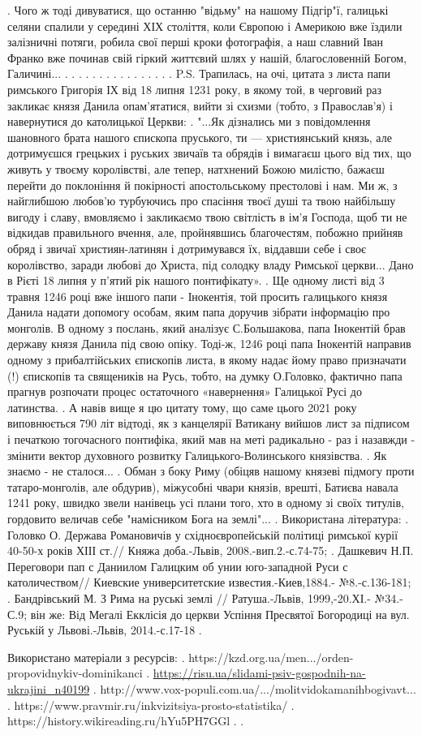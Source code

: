 .
Чого ж тоді дивуватися, що останню "відьму" на нашому Підгір"ї, галицькі селяни спалили у середині ХІХ століття, коли Європою і Америкою вже їздили залізничні потяги, робила свої перші кроки фотографія, а наш славний  Іван Франко вже  починав свій гіркий життєвий шлях у нашій, благословенній Богом, Галичині...
.
.
.
.
.
.
.
.
.
.
.
.
.
.
.
.
P.S.
Трапилась, на очі, цитата з листа папи римського Григорія ІХ від 18 липня 1231 року, в якому той, в черговий раз закликає князя Данила опам'ятатися, вийти зі схизми (тобто, з Православ'я) і навернутися до католицької Церкви:
.
"...Як дізнались ми з повідомлення шановного брата нашого єпископа пруського, ти — християнський князь, але дотримуєшся грецьких і руських звичаїв та обрядів і вимагаєш цього від тих, що живуть у твоєму королівстві, але тепер, натхнений Божою милістю, бажаєш перейти до поклоніння й покірності апостольському престолові і нам. Ми ж, з найглибшою любов’ю турбуючись про спасіння твоєї душі та твою найбільшу вигоду і славу, вмовляємо і закликаємо твою світлість в ім’я Господа, щоб ти не відкидав правильного вчення, але, пройнявшись благочестям, побожно прийняв обряд і звичаї християн-латинян і дотримувався їх, віддавши себе і своє королівство, заради любові до Христа, під солодку владу Римської церкви... Дано в Рієті 18 липня у  п’ятий рік нашого понтифікату». 
.
Ще одному листі від 3 травня 1246 році вже іншого папи - Інокентія, той просить галицького князя Данила надати допомогу особам, яким папа доручив зібрати інформацію про монголів. В одному з послань, який аналізує С.Большакова, папа Інокентій брав державу князя Данила під свою опіку.
Тоді-ж, 1246 році папа Інокентій направив одному з прибалтійських єпископів листа, в якому надає йому право призначати (!) єпископів та священиків на Русь, тобто, на думку О.Головко, фактично папа прагнув розпочати процес остаточного «навернення» Галицької Русі до латинства.
.
А навів вище я цю цитату тому, що саме цього 2021 року виповнюється 790 літ відтоді, як з канцелярії Ватикану вийшов лист за підписом і печаткою тогочасного понтифіка, який мав на меті радикально - раз і назавжди - змінити вектор духовного розвитку Галицького-Волинського князівства.
.
Як знаємо - не сталося... 
.
Обман з боку Риму (обіцяв нашому князеві підмогу проти татаро-монголів, але обдурив), міжусобні чвари князів, врешті, Батиєва навала 1241 року, швидко звели нанівець усі плани того, хто в одному зі своїх титулів, гордовито величав себе "намісником Бога на землі"...
.
Використана література:
.
 Головко О. Держава Романовичів у східноєвропейській політиці римської курії 40-50-х років ХІІІ ст.// Княжа доба.-Львів, 2008.-вип.2.-с.74-75;
.
Дашкевич Н.П. Переговори пап с Даниилом Галицким об унии юго-западной Руси с католичеством// Киевские университетские известия.-Киев,1884.- №8.-с.136-181;
.
Бандрівський М. З Рима на руські землі // Ратуша.-Львів, 1999,-20.ХІ.- №34.-С.9; він же: Від Мегалі Екклісія до церкви Успіння Пресвятої Богородиці на вул. Руській у Львові.-Львів, 2014.-с.17-18
.

Використано матеріали з ресурсів:
.
https://kzd.org.ua/men.../orden-propovidnykiv-dominikanci
.
\url{https://risu.ua/slidami-psiv-gospodnih-na-ukrajini_n40199}
.
http://www.vox-populi.com.ua/.../molitvidokamanihbogivavt...
.
https://www.pravmir.ru/inkvizitsiya-prosto-statistika/
.
https://history.wikireading.ru/hYu5PH7GGl
.
.

